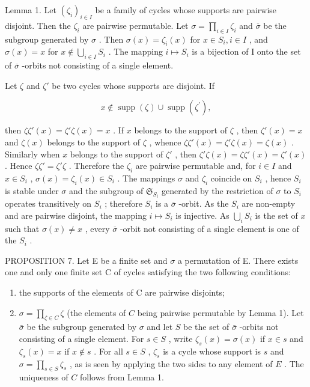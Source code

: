 Lemma 1. Let \((\zeta_{i})_{i\in I}\) be a family of cycles whose supports are pairwise disjoint. Then the \(\zeta_{i}\) are pairwise permutable. Let \(\sigma = \prod_{i\in I}\zeta_{i}\) and \(\overline{\sigma}\) be the subgroup generated by \(\sigma\) . Then \(\sigma(x) = \zeta_{i}(x)\) for \(x\in S_{i}, i\in I\) , and \(\sigma(x) = x\) for \(x\notin \bigcup_{i\in I}S_{i}\) . The mapping \(i\mapsto S_i\) is a bijection of I onto the set of \(\overline{\sigma}\) -orbits not consisting of a single element.

Let \(\zeta\) and \(\zeta'\) be two cycles whose supports are disjoint. If

\[
x \notin \operatorname{supp} (\zeta) \cup \operatorname{supp} \left(\zeta^ {\prime}\right),
\]

then \(\zeta\zeta'(x) = \zeta'\zeta(x) = x\) . If \(x\) belongs to the support of \(\zeta\) , then \(\zeta'(x) = x\) and \(\zeta(x)\) belongs to the support of \(\zeta\) , whence \(\zeta\zeta'(x) = \zeta'\zeta(x) = \zeta(x)\) . Similarly when \(x\) belongs to the support of \(\zeta'\) , then \(\zeta'\zeta(x) = \zeta\zeta'(x) = \zeta'(x)\) . Hence \(\zeta\zeta' = \zeta'\zeta\) . Therefore the \(\zeta_i\) are pairwise permutable and, for \(i \in I\) and \(x \in S_i\) , \(\sigma(x) = \zeta_i(x) \in S_i\) . The mappings \(\sigma\) and \(\zeta_i\) coincide on \(S_i\) , hence \(S_i\) is stable under \(\sigma\) and the subgroup of \(\mathfrak{S}_{S_i}\) generated by the restriction of \(\sigma\) to \(S_i\) operates transitively on \(S_i\) ; therefore \(S_i\) is a \(\overline{\sigma}\) -orbit. As the \(S_i\) are non-empty and are pairwise disjoint, the mapping \(i \mapsto S_i\) is injective. As \(\bigcup_{i} S_i\) is the set of \(x\) such that \(\sigma(x) \neq x\) , every \(\overline{\sigma}\) -orbit not consisting of a single element is one of the \(S_i\) .

PROPOSITION 7. Let E be a finite set and \(\sigma\) a permutation of E. There exists one and only one finite set C of cycles satisfying the two following conditions:

\begin{enumerate}
\def\labelenumi{(\alph{enumi})}
\item
  the supports of the elements of C are pairwise disjoints;
\item
  \(\sigma = \prod_{\zeta \in C} \zeta\) (the elements of \(C\) being pairwise permutable by Lemma 1). Let \(\bar{\sigma}\) be the subgroup generated by \(\sigma\) and let \(S\) be the set of \(\bar{\sigma}\) -orbits not consisting of a single element. For \(s \in S\) , write \(\zeta_s(x) = \sigma(x)\) if \(x \in s\) and \(\zeta_s(x) = x\) if \(x \notin s\) . For all \(s \in S\) , \(\zeta_s\) is a cycle whose support is \(s\) and \(\sigma = \prod_{s \in S} \zeta_s\) , as is seen by applying the two sides to any element of \(E\) . The uniqueness of \(C\) follows from Lemma 1.
\end{enumerate}

